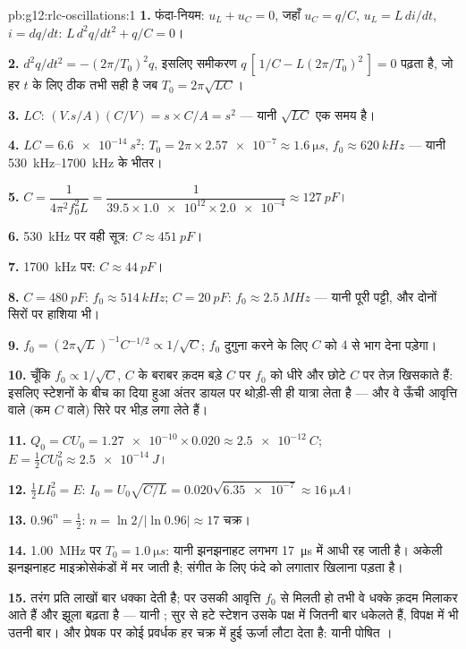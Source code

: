 \begin{solution}{pb:g12:rlc-oscillations:1}
\textbf{1.} फंदा-नियम: $u_L + u_C = 0$, जहाँ $u_C = q/C$, $u_L = L\,di/dt$, $i = dq/dt$: $L\,d^2q/dt^2 + q/C = 0$।

\textbf{2.} $d^2q/dt^2 = -(2\pi/T_0)^2 q$, इसलिए समीकरण $q\,[\,1/C - L(2\pi/T_0)^2\,] = 0$ पढ़ता है, जो हर $t$ के लिए ठीक
तभी सही है जब $T_0 = 2\pi\sqrt{LC}$।

\textbf{3.} $LC$: $(\unit{V.s/A})(\unit{C/V}) = \unit{s} \times
\unit{C/A} = \unit{s^2}$ --- यानी $\sqrt{LC}$ एक समय है।

\textbf{4.} $LC = \qty{6.6e-14}{s^2}$: $T_0 = 2\pi \times \num{2.57e-7}
\approx \qty{1.6}{\micro s}$, $f_0 \approx \qty{620}{kHz}$ --- यानी \qtyrange{530}{1700}{kHz} के
भीतर।

\textbf{5.} $C = \dfrac{1}{4\pi^2 f_0^2 L} = \dfrac{1}{39.5 \times
\num{1.0e12} \times \num{2.0e-4}} \approx \qty{127}{pF}$।

\textbf{6.} \qty{530}{kHz} पर वही सूत्र: $C \approx \qty{451}{pF}$।

\textbf{7.} \qty{1700}{kHz} पर: $C \approx \qty{44}{pF}$।

\textbf{8.} $C = \qty{480}{pF}$: $f_0 \approx \qty{514}{kHz}$; $C = \qty{20}{pF}$: $f_0 \approx \qty{2.5}{MHz}$ --- यानी पूरी पट्टी, और दोनों
सिरों पर हाशिया भी।

\textbf{9.} $f_0 = (2\pi\sqrt{L})^{-1}C^{-1/2} \propto 1/\sqrt{C}$; $f_0$ दुगुना करने के लिए $C$ को $4$ से भाग देना
पड़ेगा।

\textbf{10.} चूँकि $f_0 \propto 1/\sqrt{C}$, $C$ के बराबर क़दम बड़े $C$ पर $f_0$ को
धीरे और छोटे $C$ पर तेज़ खिसकाते हैं: इसलिए स्टेशनों के बीच का दिया हुआ
अंतर डायल पर थोड़ी-सी ही यात्रा लेता है --- और वे ऊँची आवृत्ति वाले
(कम $C$ वाले) सिरे पर भीड़ लगा लेते हैं।

\textbf{11.} $Q_0 = CU_0 = \num{1.27e-10} \times 0.020 \approx
\qty{2.5e-12}{C}$; $E = \tfrac12 CU_0^2 \approx \qty{2.5e-14}{J}$।

\textbf{12.} $\tfrac12 LI_0^2 = E$: $I_0 = U_0\sqrt{C/L} =
0.020\sqrt{\num{6.35e-7}} \approx \qty{16}{\micro A}$।

\textbf{13.} $0.96^n = \tfrac12$: $n = \ln 2/\lvert\ln 0.96\rvert
\approx 17$ चक्र।

\textbf{14.} \qty{1.00}{MHz} पर $T_0 = \qty{1.0}{\micro s}$: यानी झनझनाहट लगभग \qty{17}{\micro s} में आधी रह जाती है।
अकेली झनझनाहट माइक्रोसेकंडों में मर जाती है; संगीत के लिए फंदे को लगातार
खिलाना पड़ता है।

\textbf{15.} तरंग प्रति  लाखों बार धक्का देती है; पर उसकी
आवृत्ति $f_0$ से मिलती हो तभी वे धक्के क़दम मिलाकर आते हैं और झूला
बढ़ता है --- यानी ; सुर से हटे स्टेशन उसके पक्ष में जितनी बार
धकेलते हैं, विपक्ष में भी उतनी बार। और प्रेषक पर कोई प्रवर्धक हर चक्र में
 हुई ऊर्जा लौटा देता है: यानी पोषित ।


\end{solution}
